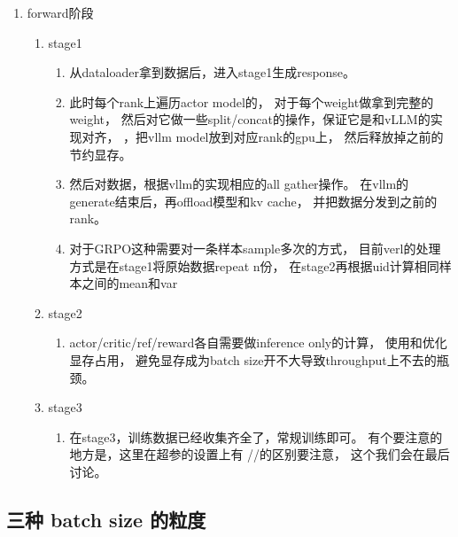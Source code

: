 \documentclass[UTF8,fontset=fandol]{ctexart}
\begin{document}
\begin{enumerate}
  \item forward阶段
  \begin{enumerate}
    \item stage1
    \begin{enumerate}
      \item 从dataloader拿到数据后，进入stage1生成response。
      \item 此时每个rank上遍历actor model的，
        对于每个weight做拿到完整的weight，
        然后对它做一些split/concat的操作，保证它是和vLLM的实现对齐，
        ，把vllm model放到对应rank的gpu上，
        然后释放掉之前的节约显存。
      \item 然后对数据，根据vllm的实现相应的all gather操作。
        在vllm的generate结束后，再offload模型和kv cache，
        并把数据分发到之前的rank。
      \item 对于GRPO这种需要对一条样本sample多次的方式，
        目前verl的处理方式是在stage1将原始数据repeat n份，
        在stage2再根据uid计算相同样本之间的mean和var
    \end{enumerate}
    \item stage2
    \begin{enumerate}
      \item actor/critic/ref/reward各自需要做inference only的计算，
        使用和优化显存占用，
        避免显存成为batch size开不大导致throughput上不去的瓶颈。
    \end{enumerate}
    \item stage3
    \begin{enumerate}
      \item 在stage3，训练数据已经收集齐全了，常规训练即可。
        有个要注意的地方是，这里在超参的设置上有
        //的区别要注意，
        这个我们会在最后讨论。
    \end{enumerate}
  \end{enumerate}
\end{enumerate}

\subsection{三种 batch size 的粒度}
\label{sec:batchsize}
\end{document}
